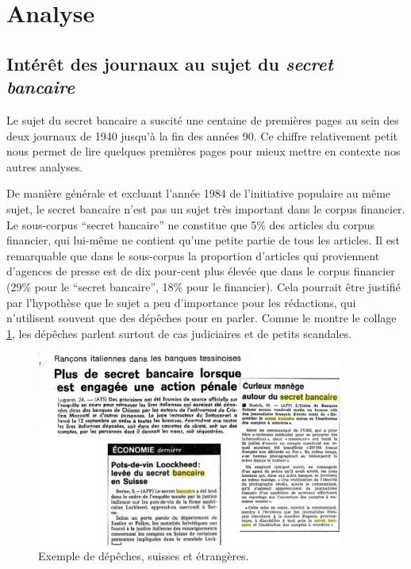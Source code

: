 \documentclass[11pt]{article}
\begin{document}
\hypertarget{analyse}{%
\section{Analyse}\label{analyse}}

\hypertarget{intuxe9ruxeat-des-journaux-au-sujet-du-secret-bancaire}{%
\subsection{\texorpdfstring{Intérêt des journaux au sujet du
\emph{secret
bancaire}}{Intérêt des journaux au sujet du secret bancaire}}\label{intuxe9ruxeat-des-journaux-au-sujet-du-secret-bancaire}}

Le sujet du secret bancaire a suscité une centaine de premières pages au
sein des deux journaux de 1940 jusqu'à la fin des années 90. Ce chiffre
relativement petit nous permet de lire quelques premières pages pour
mieux mettre en contexte nos autres analyses.

De manière générale et excluant l'année 1984 de l'initiative populaire
au même sujet, le secret bancaire n'est pas un sujet très important dans
le corpus financier. Le sous-corpus ``secret bancaire'' ne constitue que
5\% des articles du corpus financier, qui lui-même ne contient qu'une
petite partie de tous les articles. Il est remarquable que dans le
sous-corpus la proportion d'articles qui proviennent d'agences de presse
est de dix pour-cent plus élevée que dans le corpus financier (29\% pour
le ``secret bancaire'', 18\% pour le financier). Cela pourrait être
justifié par l'hypothèse que le sujet a peu d'importance pour les
rédactions, qui n'utilisent souvent que des dépêches pour en parler.
Comme le montre le collage \ref{depeches}, les dépêches parlent surtout
de cas judiciaires et de petits scandales.

\begin{figure}
\centering
\includegraphics[width=0.9\textwidth ]{analysis/agencies_collage.png}
\caption{\label{depeches} Exemple de dépêches, suisses et étrangères.}
\end{figure}
\end{document}

